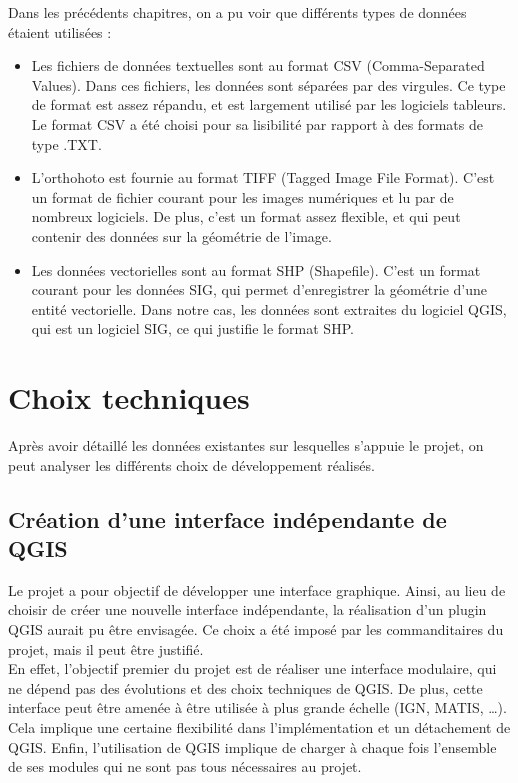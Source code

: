 \noindent Dans les précédents chapitres, on a pu voir que différents types de données étaient utilisées :
\begin{itemize}[label=$\rightarrow$]
	\item Les fichiers de données textuelles sont au format CSV (Comma-Separated Values). Dans ces fichiers, les données sont séparées par des virgules. Ce type de format est assez répandu, et est largement utilisé par les logiciels tableurs.  Le format CSV a été choisi pour sa lisibilité par rapport à des formats de type .TXT. 
	\item L’orthohoto est fournie au format TIFF (Tagged Image File Format). C’est un format de fichier courant pour les images numériques et lu par de nombreux logiciels. De plus, c’est un format assez flexible, et qui peut contenir des données sur la géométrie de l’image.
	\item Les données vectorielles sont au format SHP (Shapefile). C’est un format courant pour les données SIG, qui permet d’enregistrer la géométrie d’une entité vectorielle. Dans notre cas, les données sont extraites du logiciel QGIS, qui est un logiciel SIG, ce qui justifie le format SHP.
\end{itemize}

\newpage

\section{Choix techniques}

Après avoir détaillé les données existantes sur lesquelles s'appuie le projet, on peut analyser les différents choix de développement réalisés.  

\subsection{Création d'une interface indépendante de QGIS}

Le projet  a pour objectif de développer une interface graphique. Ainsi, au lieu de choisir de créer une nouvelle interface indépendante, la réalisation d’un plugin QGIS aurait pu être envisagée.  Ce choix a été imposé par les commanditaires du projet, mais il peut être justifié. \\

En effet, l’objectif premier du projet est de réaliser une interface modulaire, qui ne dépend pas des évolutions et des choix techniques de QGIS. De plus, cette interface peut être amenée à être utilisée à plus grande échelle (IGN, MATIS, …). Cela implique une certaine flexibilité dans l’implémentation et un détachement de QGIS. Enfin, l’utilisation de QGIS implique de charger à chaque fois l’ensemble de ses modules qui ne sont pas tous nécessaires au projet. \\

